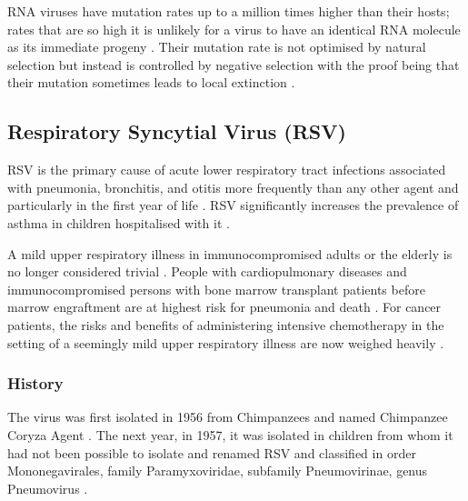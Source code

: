 \documentclass[10pt, a4paper]{article}
\begin{document}
RNA viruses have mutation rates up to a million times higher than their hosts;
rates that are so high it is unlikely for a virus to have an identical RNA
molecule as its immediate progeny \cite{domingoViralQuasispeciesEvolution2012}.
Their mutation rate is not optimised by natural selection but instead is
controlled by negative selection with the proof being that their mutation
sometimes leads to local extinction \cite{duffyWhyAreRNA2018}.

\subsection{Respiratory Syncytial Virus (RSV)}
\label{sec:org7bd1f51}
RSV is the primary cause of acute lower respiratory tract infections associated
with pneumonia, bronchitis, and otitis
\cite{borchersRespiratorySyncytialVirus2013,kleinRoleRespiratorySyncytial1982,zlatevaMolecularEvolutionCirculation2004}
more frequently than any other agent and particularly in the first year of life
\cite{stottRespiratorySyncytialVirus1985}.
RSV significantly increases the prevalence of asthma in children hospitalised
with it \cite{saglaniViralInfectionsDevelopment2013}.

A mild upper respiratory illness in immunocompromised adults or the elderly is
no longer considered trivial \cite{whimbeyRespiratorySyncytialVirus2000}.
People with cardiopulmonary diseases and immunocompromised persons with bone
marrow transplant patients before marrow engraftment are at highest risk for
pneumonia and death \cite{morrisRecoveryCytopathogenicAgent1956}.
For cancer patients, the risks and benefits of administering intensive
chemotherapy in the setting of a seemingly mild upper respiratory illness are
now weighed heavily \cite{kleinRoleRespiratorySyncytial1982}.

\subsubsection{History}
\label{sec:orgdff3771}
The virus was first isolated in 1956 from Chimpanzees and named Chimpanzee
Coryza Agent \cite{morrisRecoveryCytopathogenicAgent1956}.
The next year, in 1957, it was isolated in
children from whom it had not been possible to isolate and renamed RSV and
classified in order Mononegavirales, family Paramyxoviridae, subfamily
Pneumovirinae, genus Pneumovirus
\cite{chanockRecoveryInfantsRespiratory1957,beemAssociationChimpanzeeCoryza1960,zlatevaGeneticVariabilityMolecular2005}.
\end{document}
